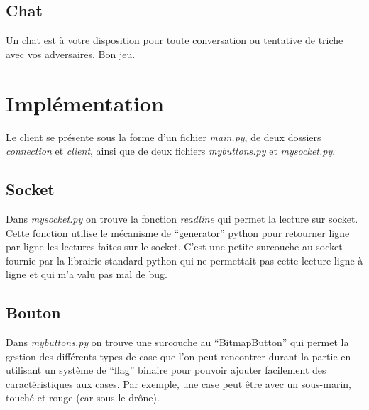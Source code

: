 \documentclass[a4paper, 11pt]{report}
\begin{document}
\subsection{Chat}
Un chat est à votre disposition pour toute conversation ou tentative de triche avec vos adversaires.
\newline
\newline
Bon jeu.

\section{Implémentation}

Le client se présente sous la forme d'un fichier \emph{main.py}, de deux dossiers 
\emph{connection} et \emph{client}, ainsi que de deux fichiers
\emph{mybuttons.py} et \emph{mysocket.py}.

\subsection{Socket}
Dans \emph{mysocket.py} on trouve la fonction \emph{readline} 
qui permet la lecture sur socket. Cette fonction utilise le mécanisme de ``generator'' python pour retourner ligne par ligne 
les lectures faites sur le socket. C'est une petite surcouche au socket fournie par la librairie standard python qui ne permettait pas cette 
lecture ligne à ligne et qui m'a valu pas mal de bug.

\subsection{Bouton}
Dans \emph{mybuttons.py} on trouve une surcouche au ``BitmapButton'' qui permet la gestion des différents types de 
case que l'on peut rencontrer durant la partie en utilisant un système de ``flag'' binaire pour pouvoir ajouter facilement des caractéristiques aux cases.
Par exemple, une case peut être avec un sous-marin, touché et rouge (car sous le drône).
\end{document}

